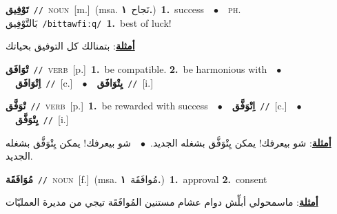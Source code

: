 \documentclass[10pt,a4paper,twoside]{article} %
\begin{document}
\begin{multicols}{2}
{\setlength\topsep{0pt}\textbf{\foreignlanguage{arabic}{تَوْفِيق}}\ {\color{gray}\texttt{//}\color{black}}\ \textsc{noun}\ [m.]\ \color{gray}(msa. \foreignlanguage{arabic}{نَجاح}~\foreignlanguage{arabic}{\textbf{١.}})\color{black}\ \textbf{1.}~success\ \ $\bullet$\ \ \textsc{ph.} \color{gray} \foreignlanguage{arabic}{بَالتَّوْفِيق}\color{black}\ {\color{gray}\texttt{/{\sffamily bittawfiːq}/}\color{black}}\ \textbf{1.}~best of luck!\  \begin{flushright}\color{gray}\foreignlanguage{arabic}{\textbf{\underline{\foreignlanguage{arabic}{أمثلة}}}: بتمنالك كل التوفيق بحياتك}\end{flushright}\color{black}} \vspace{2mm}

{\setlength\topsep{0pt}\textbf{\foreignlanguage{arabic}{تْوَافَق}}\ {\color{gray}\texttt{//}\color{black}}\ \textsc{verb}\ [p.]\ \textbf{1.}~be compatible.  \textbf{2.}~be harmonious with\ \ $\bullet$\ \ \setlength\topsep{0pt}\textbf{\foreignlanguage{arabic}{اِتْوَافَق}}\ {\color{gray}\texttt{//}\color{black}}\ [c.]\ \ $\bullet$\ \ \setlength\topsep{0pt}\textbf{\foreignlanguage{arabic}{يِتْوَافَق}}\ {\color{gray}\texttt{//}\color{black}}\ [i.]\ } \vspace{2mm}

{\setlength\topsep{0pt}\textbf{\foreignlanguage{arabic}{تْوَفَّق}}\ {\color{gray}\texttt{//}\color{black}}\ \textsc{verb}\ [p.]\ \textbf{1.}~be rewarded with success\ \ $\bullet$\ \ \setlength\topsep{0pt}\textbf{\foreignlanguage{arabic}{اِتْوَفَّق}}\ {\color{gray}\texttt{//}\color{black}}\ [c.]\ \ $\bullet$\ \ \setlength\topsep{0pt}\textbf{\foreignlanguage{arabic}{يِتْوَفَّق}}\ {\color{gray}\texttt{//}\color{black}}\ [i.]\  \begin{flushright}\color{gray}\foreignlanguage{arabic}{\textbf{\underline{\foreignlanguage{arabic}{أمثلة}}}: شو بيعرفك! يمكن يِتْوَفَّق بشغله الجديد.\ $\bullet$\ \  شو بيعرفك! يمكن يِتْوَفَّق بشغله الجديد.}\end{flushright}\color{black}} \vspace{2mm}

{\setlength\topsep{0pt}\textbf{\foreignlanguage{arabic}{مُوَافَقَة}}\ {\color{gray}\texttt{//}\color{black}}\ \textsc{noun}\ [f.]\ \color{gray}(msa. \foreignlanguage{arabic}{مُوافَقَة}~\foreignlanguage{arabic}{\textbf{١.}})\color{black}\ \textbf{1.}~approval  \textbf{2.}~consent\  \begin{flushright}\color{gray}\foreignlanguage{arabic}{\textbf{\underline{\foreignlanguage{arabic}{أمثلة}}}: ماسمحولي أبلِّش دوام عشام مستنين المُوافَقَة تيجي من مديرة العمليّات}\end{flushright}\color{black}} \vspace{2mm}


\end{multicols}
\end{document}
